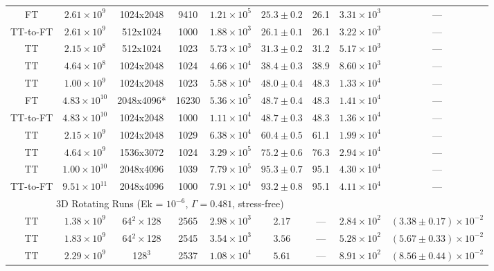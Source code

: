 \documentclass[aps, pre, onecolumn, nofootinbib, notitlepage, groupedaddress, amsfonts, amssymb, amsmath, longbibliography, superscriptaddress]{revtex4-1}
\begin{document}
\begin{table}[ht]
\begin{center}
{\begin{tabular}{c c c c c c c c c}
FT			&	$2.61 \times 10^9$		&	1024x2048	&	9410		&	$1.21 \times 10^5$	&	$25.3 \pm 0.2$	&	26.1	&	$3.31 \times 10^3$ & --- \\
TT-to-FT	&	$2.61 \times 10^9$		&	512x1024	&	1000		&	$1.88 \times 10^3$	&	$26.1 \pm 0.1$	&	26.1	&	$3.22 \times 10^3$ & --- \\
TT			&	$2.15 \times 10^8$		&	512x1024	&	1023		&	$5.73 \times 10^3$	&	$31.3 \pm 0.2$	&	31.2	&	$5.17 \times 10^3$ & --- \\
TT			&	$4.64 \times 10^8$		&	1024x2048	&	1024		&	$4.66 \times 10^4$	&	$38.4 \pm 0.3$	&	38.9	&	$8.60 \times 10^3$ & --- \\
TT			&	$1.00 \times 10^9$		&	1024x2048	&	1023		&	$5.58 \times 10^4$	&	$48.0 \pm 0.4$	&	48.3	&	$1.33 \times 10^4$ & --- \\
FT			&	$4.83 \times 10^{10}$	&	2048x4096*	&	16230		&	$5.36 \times 10^5$	&	$48.7 \pm 0.4$	&	48.3	&	$1.41 \times 10^4$ & --- \\
TT-to-FT	&	$4.83 \times 10^{10}$	&	1024x2048	&	1000		&	$1.11 \times 10^4$	&	$48.7 \pm 0.3$	&	48.3	&	$1.36 \times 10^4$ & --- \\
TT			&	$2.15 \times 10^9$		&	1024x2048	&	1029		&	$6.38 \times 10^4$	&	$60.4 \pm 0.5$	&	61.1	&	$1.99 \times 10^4$ & --- \\
TT			&	$4.64 \times 10^9$		&	1536x3072	&	1024		&	$3.29 \times 10^5$	&	$75.2 \pm 0.6$	&	76.3	&	$2.94 \times 10^4$ & --- \\
TT			&	$1.00 \times 10^{10}$	&	2048x4096	&	1039		&	$7.79 \times 10^5$	&	$95.3 \pm 0.7$	&	95.1	&	$4.30 \times 10^4$ & --- \\
TT-to-FT	&	$9.51 \times 10^{11}$	&	2048x4096	&	1000		&	$7.91 \times 10^4$	& 	$93.2 \pm 0.8$ 	&	95.1	&	$4.11 \times 10^4$ & --- \\
\hline																	
\multicolumn{7}{c}{\vspace{0.1cm}3D Rotating Runs (Ek = $10^{-6}$, $\Gamma = 0.481$, stress-free)} \\
\hline																	
TT	&	$1.38 \times 10^9$		&	64$^2\times$128 	&	2565		&	$2.98 \times 10^3$	&	$2.17$			&	---		&	$2.84 \times 10^2$  & $(3.38 \pm 0.17) \times 10^{-2}$ \\
TT	&	$1.83 \times 10^9$		&	64$^2\times$128 	&	2545		&	$3.54 \times 10^3$	&	$3.56$			&	---		&	$5.28 \times 10^2$  & $(5.67 \pm 0.33) \times 10^{-2}$ \\
TT	&	$2.29 \times 10^9$		&	128$^3$				&	2537		&	$1.08 \times 10^4$	&	$5.61$			&	---		&	$8.91 \times 10^2$  & $(8.56 \pm 0.44) \times 10^{-2}$ \\

\end{tabular}}
\end{center}
\end{table}
\end{document}
